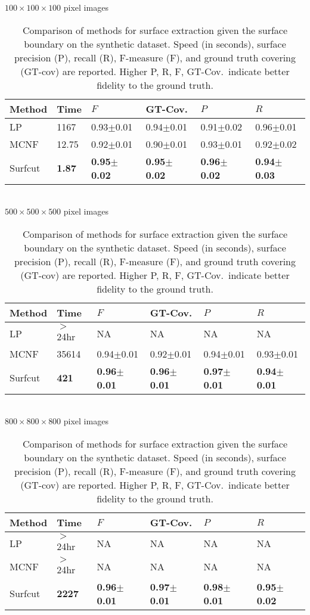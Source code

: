 \documentclass[10pt,journal,compsoc]{IEEEtran}
\begin{document}
\begin{table}
  \caption{Comparison of methods for surface extraction given the
    surface boundary on the synthetic dataset. Speed (in seconds),
    surface precision (P), recall (R), F-measure (F), and ground truth
    covering (GT-cov) are reported. Higher P, R, F, GT-Cov.~indicate
    better fidelity to the ground truth.}
  \label{tab:synth}
  \centering
  $100 \times 100 \times 100$ pixel images \\ \vspace{2mm}
  \begin{tabular}{ l | l | l | l | l | l }
    Method & Time  & $F$ &  GT-Cov. &  $P$ &  $R$ \\
    \hline
    LP & 1167 & 0.93$\pm$0.01 & 0.94$\pm$0.01 & 0.91$\pm$0.02 & 0.96$\pm$0.01    \\
    MCNF & 12.75 & 0.92$\pm$0.01 & 0.90$\pm$0.01 & 0.93$\pm$0.01 & 0.92$\pm$0.02    \\
    Surfcut & {\bf 1.87} & {\bf 0.95$\pm$0.02} & {\bf 0.95$\pm$0.02} &
                                                                       {\bf
                                                                       0.96$\pm$0.02}
                                           & {\bf 0.94$\pm$0.03}    \\
    \hline
  \end{tabular}\\ \vspace{3mm}
  $500 \times 500 \times 500$ pixel images \\ \vspace{2mm}
  \begin{tabular}{ l | l | l | l | l | l }
    Method & Time & $F$ &  GT-Cov. &  $P$ &  $R$ \\
    \hline
    LP & $>$24hr & NA & NA & NA & NA    \\
    MCNF & 35614 & 0.94$\pm$0.01 & 0.92$\pm$0.01 & 0.94$\pm$0.01 & 0.93$\pm$0.01    \\
    Surfcut & {\bf 421} &  {\bf 0.96$\pm$0.01} &  {\bf 0.96$\pm$0.01} &  {\bf 0.97$\pm$0.01} &  {\bf 0.94$\pm$0.01}    \\
    \hline
  \end{tabular}\\ \vspace{3mm}
  $800 \times 800 \times 800$ pixel images \\ \vspace{2mm}
  \begin{tabular}{ l | l | l | l | l | l }
    Method & Time & $F$ &  GT-Cov. &  $P$ &  $R$ \\
    \hline
    LP & $>$24hr & NA & NA & NA & NA \\
    MCNF & $>$24hr & NA & NA & NA & NA \\
    Surfcut &  {\bf 2227} &  {\bf 0.96$\pm$0.01} &  {\bf 0.97$\pm$0.01} &  {\bf 0.98$\pm$0.01} &  {\bf 0.95$\pm$0.02}    \\
    \hline
  \end{tabular}
\end{table}
\end{document}
